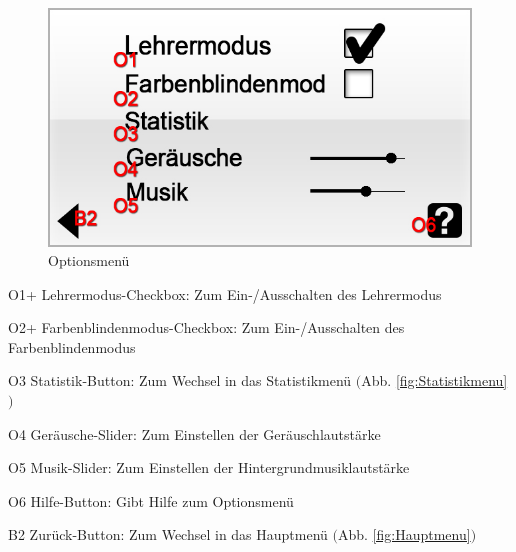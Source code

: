 
\begin{figure}[H]
\centering
\includegraphics[scale=0.55]{../gui/_jpeg_numeration/settings.jpg}
\caption{Optionsmenü}
\label{fig:Optionsmenu}
\end{figure}
\begin{description*}
\item[O1+] Lehrermodus-Checkbox: Zum Ein-/Ausschalten des Lehrermodus
\item[O2+] Farbenblindenmodus-Checkbox: Zum Ein-/Ausschalten des Farbenblindenmodus
\item[O3] Statistik-Button: Zum Wechsel in das Statistikmenü $($Abb. \ref{fig:Statistikmenu}$)$
\item[O4] Geräusche-Slider: Zum Einstellen der Geräuschlautstärke
\item[O5] Musik-Slider: Zum Einstellen der Hintergrundmusiklautstärke
\item[O6] Hilfe-Button: Gibt Hilfe zum Optionsmenü
\item[B2] Zurück-Button: Zum Wechsel in das Hauptmenü $($Abb. \ref{fig:Hauptmenu}$)$
\end{description*}



